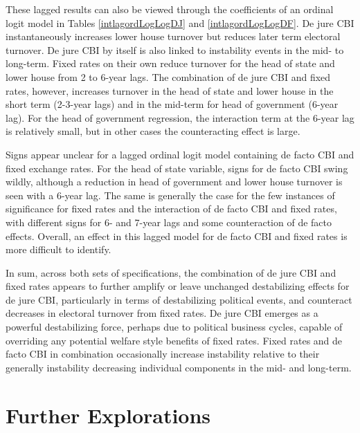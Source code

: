 \documentclass{article}
\begin{document}
    
    

    These lagged results can also be viewed through the coefficients of an ordinal logit model in Tables \ref*{intlagordLogLogDJ} and \ref*{intlagordLogLogDF}. De jure CBI instantaneously increases lower house turnover but reduces later term electoral turnover. De jure CBI by itself is also linked to instability events in the mid- to long-term. Fixed rates on their own reduce turnover for the head of state and lower house from 2 to 6-year lags. The combination of de jure CBI and fixed rates, however, increases turnover in the head of state and lower house in the short term (2-3-year lags) and in the mid-term for head of government (6-year lag). For the head of government regression, the interaction term at the 6-year lag is relatively small, but in other cases the counteracting effect is large.
    
    Signs appear unclear for a lagged ordinal logit model containing de facto CBI and fixed exchange rates. For the head of state variable, signs for de facto CBI swing wildly, although a reduction in head of government and lower house turnover is seen with a 6-year lag. The same is generally the case for the few instances of significance for fixed rates and the interaction of de facto CBI and fixed rates, with different signs for 6- and 7-year lags and some counteraction of de facto effects. Overall, an effect in this lagged model for de facto CBI and fixed rates is more difficult to identify.

    

    

    In sum, across both sets of specifications, the combination of de jure CBI and fixed rates appears to further amplify or leave unchanged destabilizing effects for de jure CBI, particularly in terms of destabilizing political events, and counteract decreases in electoral turnover from fixed rates. De jure CBI emerges as a powerful destabilizing force, perhaps due to political business cycles, capable of overriding any potential welfare style benefits of fixed rates. Fixed rates and de facto CBI in combination occasionally increase instability relative to their generally instability decreasing individual components in the mid- and long-term. 

    \section*{Further Explorations}
\end{document}
